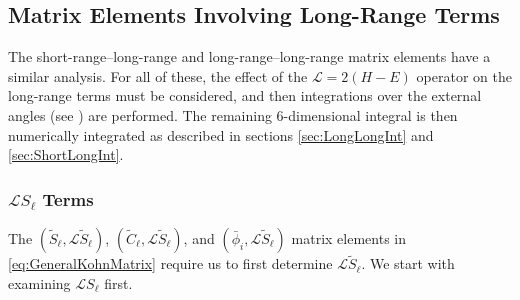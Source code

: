 \documentclass[Dissertation.tex]{subfiles}
\begin{document}
\subsection{Matrix Elements Involving Long-Range Terms}
\label{sec:MatrixLong}
The short-range--long-range and long-range--long-range matrix elements have a similar analysis. For all of these, the effect of the $\mathcal{L} = 2(H-E)$ operator on the long-range terms must be considered, and then integrations over the external angles (see ) are performed. The remaining 6-dimensional integral is then numerically integrated as described in sections \ref{sec:LongLongInt} and \ref{sec:ShortLongInt}.

\subsubsection{\texorpdfstring{$\mathcal{L}S_\ell$}{LS} Terms}
\label{sec:LSTerms}
The $(\widetilde{S}_\ell,\mathcal{L}\widetilde{S}_\ell)$, $(\widetilde{C}_\ell,\mathcal{L}\widetilde{S}_\ell)$, and $(\bar{\phi}_i,\mathcal{L}\widetilde{S}_\ell)$ matrix elements in \cref{eq:GeneralKohnMatrix} require us to first determine $\mathcal{L}\widetilde{S}_\ell$. We start with examining $\mathcal{L}S_\ell$ first.
\end{document}
